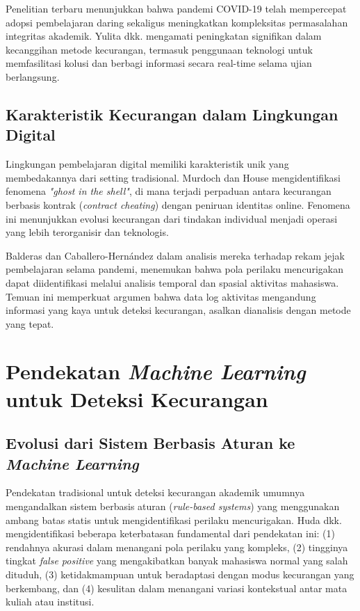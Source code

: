Penelitian terbaru menunjukkan bahwa pandemi COVID-19 telah mempercepat adopsi pembelajaran daring sekaligus meningkatkan kompleksitas permasalahan integritas akademik. Yulita dkk. \cite{Yulita2023} mengamati peningkatan signifikan dalam kecanggihan metode kecurangan, termasuk penggunaan teknologi untuk memfasilitasi kolusi dan berbagi informasi secara real-time selama ujian berlangsung.

\subsection{Karakteristik Kecurangan dalam Lingkungan Digital}

Lingkungan pembelajaran digital memiliki karakteristik unik yang membedakannya dari setting tradisional. Murdoch dan House \cite{Murdoch2019} mengidentifikasi fenomena \textit{"ghost in the shell"}, di mana terjadi perpaduan antara kecurangan berbasis kontrak (\textit{contract cheating}) dengan peniruan identitas online. Fenomena ini menunjukkan evolusi kecurangan dari tindakan individual menjadi operasi yang lebih terorganisir dan teknologis.

Balderas dan Caballero-Hernández \cite{Balderas2020} dalam analisis mereka terhadap rekam jejak pembelajaran selama pandemi, menemukan bahwa pola perilaku mencurigakan dapat diidentifikasi melalui analisis temporal dan spasial aktivitas mahasiswa. Temuan ini memperkuat argumen bahwa data log aktivitas mengandung informasi yang kaya untuk deteksi kecurangan, asalkan dianalisis dengan metode yang tepat.

\section{Pendekatan \textit{Machine Learning} untuk Deteksi Kecurangan}
\label{sec:mlApproaches}

\subsection{Evolusi dari Sistem Berbasis Aturan ke \textit{Machine Learning}}

Pendekatan tradisional untuk deteksi kecurangan akademik umumnya mengandalkan sistem berbasis aturan (\textit{rule-based systems}) yang menggunakan ambang batas statis untuk mengidentifikasi perilaku mencurigakan. Huda dkk. \cite{article:rule_based_limitations} mengidentifikasi beberapa keterbatasan fundamental dari pendekatan ini: (1) rendahnya akurasi dalam menangani pola perilaku yang kompleks, (2) tingginya tingkat \textit{false positive} yang mengakibatkan banyak mahasiswa normal yang salah dituduh, (3) ketidakmampuan untuk beradaptasi dengan modus kecurangan yang berkembang, dan (4) kesulitan dalam menangani variasi kontekstual antar mata kuliah atau institusi.

